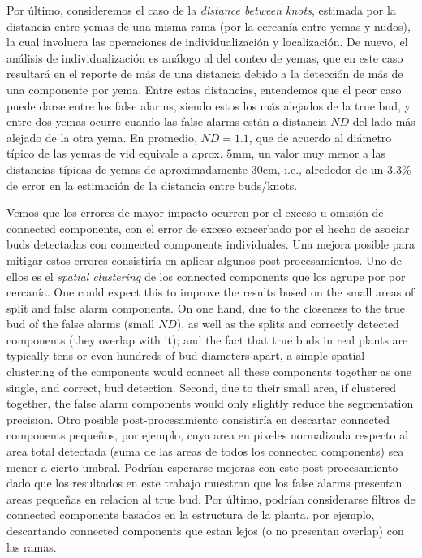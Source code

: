 \documentclass[a4paper,authoryear,review]{elsarticle}
\begin{document}
%
Por último, consideremos el caso de la \emph{distance between knots}, estimada por la distancia entre yemas de una misma rama (por la cercanía entre yemas y nudos), la cual involucra las operaciones de individualización y localización. De nuevo, el análisis de individualización es análogo al del conteo de yemas, que en este caso resultará en el reporte de más de una distancia debido a la detección de más de una componente por yema. Entre estas distancias, entendemos que el peor caso puede darse entre los false alarms, siendo estos los más alejados de la true bud, y entre dos yemas ocurre cuando las false alarms están a distancia $ND$ del lado más alejado de la otra yema. En promedio, $ND = 1.1$, que de acuerdo al diámetro típico de las yemas de vid equivale a aprox. $5$mm, un valor muy menor a las distancias típicas de yemas de aproximadamente $30$cm, i.e., alrededor de un $3.3\%$ de error en la estimación de la distancia entre buds/knots. 
%
%





Vemos que los errores de mayor impacto ocurren por el exceso u omisión de connected components, con el error de exceso exacerbado por el hecho de asociar buds detectadas con connected components individuales. 
%
Una mejora posible para mitigar estos errores consistiría en aplicar algunos post-procesamientos. 
%
Uno de ellos es el \emph{spatial clustering} de los connected components que los agrupe por por cercanía. One could expect this to improve the results based on the small areas of split and false alarm components. On one hand, due to the closeness to the true bud of the false alarms (small $ND$), as well as the splits and  correctly detected components (they overlap with it);  and the fact that true buds in real plants are typically tens or even hundreds of bud diameters apart, a simple spatial clustering of the components would connect all these components together as one single, and correct, bud detection. Second, due to their small area, if clustered together, the false alarm components would only slightly reduce the segmentation precision.
%
Otro posible post-procesamiento consistiría en descartar connected components pequeños, por ejemplo, cuya area en pixeles normalizada respecto al area total detectada (suma de las areas de todos los connected components) sea menor a cierto umbral. Podrían esperarse mejoras con este post-procesamiento dado que los resultados en este trabajo muestran que los false alarms presentan areas pequeñas en relacion al true bud.
% 
Por último, podrían considerarse filtros de connected components basados en la estructura de la planta, por ejemplo, descartando connected components que estan lejos (o no presentan overlap) con las ramas.
\end{document}
